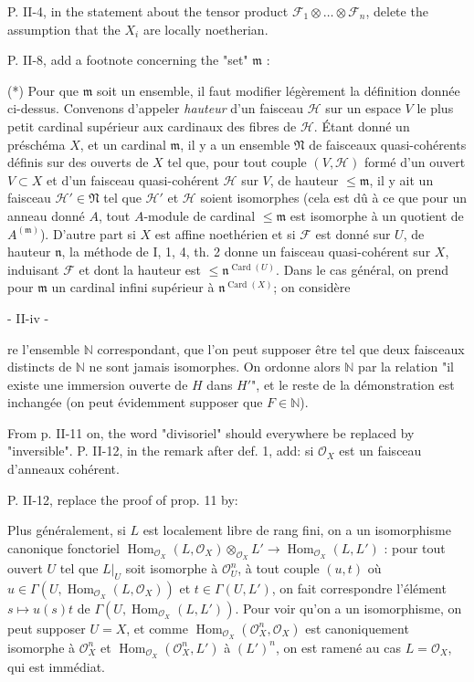 P. II-4, in the statement about the tensor product $\mathcal{F}_1 \otimes \dots \otimes \mathcal{F}_n$, delete the assumption that the $X_i$ are locally noetherian.

P. II-8, add a footnote concerning the "set" $\mathfrak{m}$ :

(*) Pour que $\mathfrak{m}$ soit un ensemble, il faut modifier légèrement la définition donnée ci-dessus. Convenons d'appeler \emph{hauteur} d'un faisceau $\mathcal{H}$ sur un espace $V$ le plus petit cardinal supérieur aux cardinaux des fibres de $\mathcal{H}$. Étant donné un préschéma $X$, et un cardinal $\mathfrak{m}$, il y a un ensemble $\mathfrak{N}$ de faisceaux quasi-cohérents définis sur des ouverts de $X$ tel que, pour tout couple $(V, \mathcal{H})$ formé d'un ouvert $V \subset X$ et d'un faisceau quasi-cohérent $\mathcal{H}$ sur $V$, de hauteur $\le \mathfrak{m}$, il y ait un faisceau $\mathcal{H}' \in \mathfrak{N}$ tel que $\mathcal{H}'$ et $\mathcal{H}$ soient isomorphes (cela est dû à ce que pour un anneau donné $A$, tout $A$-module de cardinal $\le \mathfrak{m}$ est isomorphe à un quotient de $A^{(\mathfrak{m})}$). D'autre part si $X$ est affine noethérien et si $\mathcal{F}$ est donné sur $U$, de hauteur $\mathfrak{n}$, la méthode de I, 1, 4, th. 2 donne un faisceau quasi-cohérent sur $X$, induisant $\mathcal{F}$ et dont la hauteur est $\le \mathfrak{n}^{\operatorname{Card}(U)}$. Dans le cas général, on prend pour $\mathfrak{m}$ un cardinal infini supérieur à $\mathfrak{n}^{\operatorname{Card}(X)}$; on considère

\newpage


- II-iv -

re l'ensemble $\mathbb{N}$ correspondant, que l'on peut supposer être tel que deux faisceaux distincts de $\mathbb{N}$ ne sont jamais isomorphes. On ordonne alors $\mathbb{N}$ par la relation "il existe une immersion ouverte de $H$ dans $H'$", et le reste de la démonstration est inchangée (on peut évidemment supposer que $F \in \mathbb{N}$).

From p. II-11 on, the word "divisoriel" should everywhere be replaced by "inversible". P. II-12, in the remark after def. 1, add: si $\mathcal{O}_X$ est un faisceau d'anneaux cohérent.

P. II-12, replace the proof of prop. 11 by:

Plus généralement, si $L$ est localement libre de rang fini, on a un isomorphisme canonique fonctoriel $\operatorname{Hom}_{\mathcal{O}_X}(L, \mathcal{O}_X) \otimes_{\mathcal{O}_X} L' \to \operatorname{Hom}_{\mathcal{O}_X}(L, L')$ : pour tout ouvert $U$ tel que $L|_U$ soit isomorphe à $\mathcal{O}_U^n$, à tout couple $(u, t)$ où $u \in \Gamma(U, \operatorname{Hom}_{\mathcal{O}_X}(L, \mathcal{O}_X))$ et $t \in \Gamma(U, L')$, on fait correspondre l'élément $s \mapsto u(s)t$ de $\Gamma(U, \operatorname{Hom}_{\mathcal{O}_X}(L, L'))$. Pour voir qu'on a un isomorphisme, on peut supposer $U=X$, et comme $\operatorname{Hom}_{\mathcal{O}_X}(\mathcal{O}_X^n, \mathcal{O}_X)$ est canoniquement isomorphe à $\mathcal{O}_X^n$ et $\operatorname{Hom}_{\mathcal{O}_X}(\mathcal{O}_X^n, L')$ à $(L')^n$, on est ramené au cas $L=\mathcal{O}_X$, qui est immédiat.


